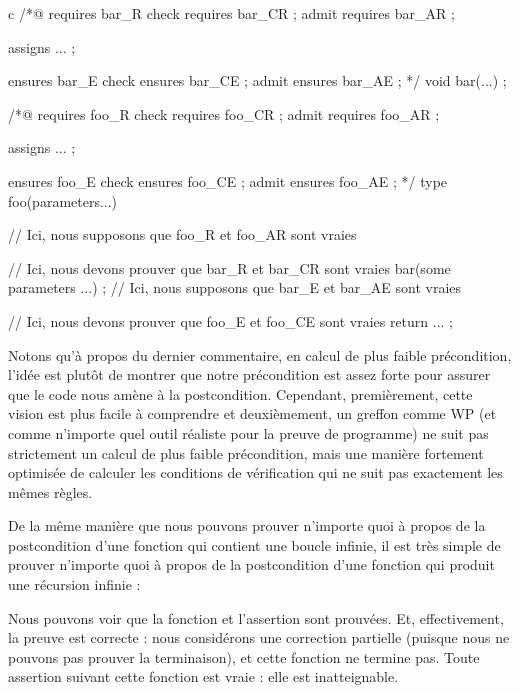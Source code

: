 \begin{CodeBlock}{c}
  /*@       requires bar_R
      check requires bar_CR ;
      admit requires bar_AR ;

      assigns ... ;

            ensures bar_E
      check ensures bar_CE ;
      admit ensures bar_AE ;
  */
  void bar(...) ;

  /*@       requires foo_R
      check requires foo_CR ;
      admit requires foo_AR ;

      assigns ... ;

            ensures foo_E
      check ensures foo_CE ;
      admit ensures foo_AE ;
  */
  type foo(parameters...){
    // Ici, nous supposons que foo_R et foo_AR sont vraies


    // Ici, nous devons prouver que bar_R et bar_CR sont vraies
    bar(some parameters ...) ;
    // Ici, nous supposons que bar_E et bar_AE sont vraies


    // Ici, nous devons prouver que foo_E et foo_CE sont vraies
    return ... ;
  }
  \end{CodeBlock}


Notons qu'à propos du dernier commentaire, en calcul de plus faible précondition,
l'idée est plutôt de montrer que notre précondition est assez forte pour assurer
que le code nous amène à la postcondition. Cependant, premièrement, cette vision
est plus facile à comprendre et deuxièmement, un greffon comme WP (et comme n'importe
quel outil réaliste pour la preuve de programme) ne suit pas strictement un calcul
de plus faible précondition, mais une manière fortement optimisée de calculer les
conditions de vérification qui ne suit pas exactement les mêmes règles.




De la même manière que nous pouvons prouver n'importe quoi à propos de la
postcondition d'une fonction qui contient une boucle infinie, il est très simple
de prouver n'importe quoi à propos de la postcondition d'une fonction qui
produit une récursion infinie :






Nous pouvons voir que la fonction et l'assertion sont prouvées. Et, effectivement,
la preuve est correcte : nous considérons une correction partielle (puisque nous ne
pouvons pas prouver la terminaison), et cette fonction ne termine pas. Toute
assertion suivant cette fonction est vraie : elle est inatteignable.



